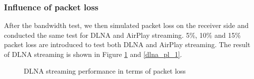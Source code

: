 \subsubsection{Influence of packet loss\label{4_1_3}}
After the bandwidth test, we then simulated packet loss on the receiver side and
conducted the same test for DLNA and AirPlay streaming. 5\%, 10\% and 15\%
packet loss are introduced to test both DLNA and AirPlay streaming. The result
of DLNA streaming is shown in Figure \ref{dlna_pl} and \ref{dlna_pl_1}.
\begin{figure}[hb]
\caption{DLNA streaming performance in terms of packet loss \label{dlna_pl}}
\end{figure}

